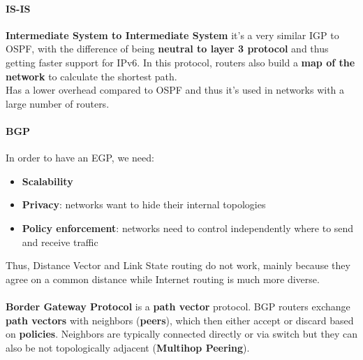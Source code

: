 \paragraph{IS-IS} \textbf{Intermediate System to Intermediate System} it's a very similar IGP to OSPF, with the difference of being \textbf{neutral to layer 3 protocol} and thus getting faster support for IPv6. In this protocol, routers also build a \textbf{map of the network} to calculate the shortest path.\\
Has a lower overhead compared to OSPF and thus it's used in networks with a large number of routers.

\paragraph{BGP} In order to have an EGP, we need:
\begin{itemize}
	\item \textbf{Scalability}
	\item \textbf{Privacy}: networks want to hide their internal topologies
	\item \textbf{Policy enforcement}: networks need to control independently where to send and receive traffic
\end{itemize}
Thus, Distance Vector and Link State routing do not work, mainly because they agree on a common distance while Internet routing is much more diverse.\\\\
\textbf{Border Gateway Protocol} is a \textbf{path vector} protocol. BGP routers exchange \textbf{path vectors} with neighbors (\textbf{peers}), which then either accept or discard based on \textbf{policies}. Neighbors are typically connected directly or via switch but they can also be not topologically adjacent (\textbf{Multihop Peering}).

